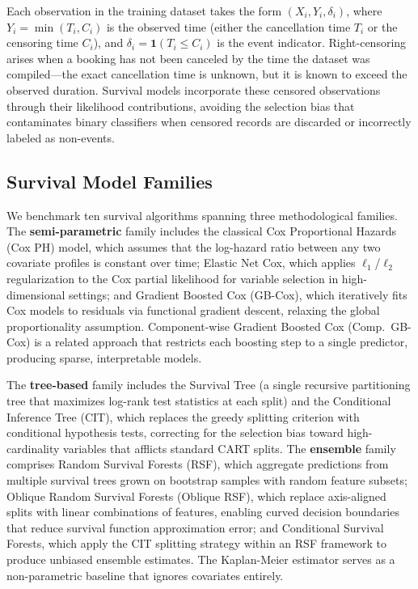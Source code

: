 \documentclass[pdflatex,iicol,sn-mathphys-ay]{sn-jnl}
\theoremstyle{thmstyleone}%
\theoremstyle{thmstyletwo}%
\theoremstyle{thmstylethree}%
\begin{document}
Each observation in the training dataset takes the form $(X_i, Y_i, \delta_i)$, where $Y_i = \min(T_i, C_i)$ is the observed time (either the cancellation time $T_i$ or the censoring time $C_i$), and $\delta_i = \mathbf{1}(T_i \leq C_i)$ is the event indicator. Right-censoring arises when a booking has not been canceled by the time the dataset was compiled—the exact cancellation time is unknown, but it is known to exceed the observed duration. Survival models incorporate these censored observations through their likelihood contributions, avoiding the selection bias that contaminates binary classifiers when censored records are discarded or incorrectly labeled as non-events.

\subsection{Survival Model Families}

We benchmark ten survival algorithms spanning three methodological families. The \textbf{semi-parametric} family includes the classical Cox Proportional Hazards (Cox PH) model, which assumes that the log-hazard ratio between any two covariate profiles is constant over time; Elastic Net Cox, which applies $\ell_1$/$\ell_2$ regularization to the Cox partial likelihood for variable selection in high-dimensional settings; and Gradient Boosted Cox (GB-Cox), which iteratively fits Cox models to residuals via functional gradient descent, relaxing the global proportionality assumption. Component-wise Gradient Boosted Cox (Comp.\ GB-Cox) is a related approach that restricts each boosting step to a single predictor, producing sparse, interpretable models.

The \textbf{tree-based} family includes the Survival Tree (a single recursive partitioning tree that maximizes log-rank test statistics at each split) and the Conditional Inference Tree (CIT), which replaces the greedy splitting criterion with conditional hypothesis tests, correcting for the selection bias toward high-cardinality variables that afflicts standard CART splits. The \textbf{ensemble} family comprises Random Survival Forests (RSF), which aggregate predictions from multiple survival trees grown on bootstrap samples with random feature subsets; Oblique Random Survival Forests (Oblique RSF), which replace axis-aligned splits with linear combinations of features, enabling curved decision boundaries that reduce survival function approximation error; and Conditional Survival Forests, which apply the CIT splitting strategy within an RSF framework to produce unbiased ensemble estimates. The Kaplan-Meier estimator serves as a non-parametric baseline that ignores covariates entirely.
\end{document}
